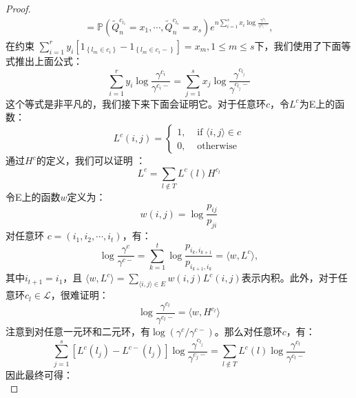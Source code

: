 \begin{proof}
\begin{equation*}
\begin{array}{l}
    =\mathbb{P}\left(\tilde{Q}_{n}^{c_{l_{1}}}=x_{1}, \cdots, \tilde{Q}_{n}^{c_{l_{s}}}=x_{s}\right) e^{n \sum_{i=1}^{s} x_{i} \log \frac{\gamma^{c_{l_i}}}{\gamma^{c_{l_i}-}}},
\end{array}
\end{equation*}
在约束 $\sum_{i=1}^{r} y_{i}\left[1_{\left\{l_{m} \in c_{i}\right\}}-1_{\left\{l_{m} \in c_{i}-\right\}}\right]=x_{m}, 1 \leq m \leq s$下，我们使用了下面等式推出上面公式：
\begin{equation} \label{constraint}
    \sum_{i=1}^{r} y_{i} \log \frac{\gamma^{c_{i}}}{\gamma^{c_{i}-}}=\sum_{j=1}^{s} x_{j} \log \frac{\gamma^{c_{l_{j}}}}{\gamma^{c_{l_{j}}-}}
\end{equation}
这个等式是非平凡的，我们接下来下面会证明它。对于任意环$c$，令$L^c$为E上的函数：
\begin{equation*}
    L^{c}(i, j)= \begin{cases}1, & \text { if }\langle i, j\rangle \in c \\ 0, & \text { otherwise }\end{cases}
\end{equation*}
通过$H^c$的定义，我们可以证明 \cite{kalpazidou2007cycle}：
\begin{equation*}
    L^c = \sum_{l \notin T} L^c(l) H^{c_l}
\end{equation*}
令E上的函数$w$定义为：
\begin{equation*}
    w(i, j) = \log \frac{p_{ij}}{p_{ji}}
\end{equation*}
对任意环 $c=(i_1, i_2, \cdots, i_t)$，有：
\begin{equation*}
    \log \frac{\gamma^{c}}{\gamma^{c-}} = \sum^t_{k=1} \log \frac{p_{i_k, i_{k+1}}}{p_{i_{k+1}, i_k}} = \langle w, L^c \rangle,
\end{equation*}
其中$i_{t+1} = i_1$，且 $\langle w, L^c \rangle = \sum_{\langle i, j \rangle \in E} w(i,j) L^c(i,j)$表示内积。此外，对于任意环$c_l \in \mathcal{L}$，很难证明：
\begin{equation*}
    \log \frac{\gamma^{c_l}}{\gamma^{c_l -}} = \langle w, H^{c_l} \rangle
\end{equation*}
注意到对任意一元环和二元环，有$\log (\gamma^c / \gamma^{c-})$。那么对任意环$c$，有：
\begin{equation*}
    \sum_{j=1}^{s}\left[L^{c}\left(l_{j}\right)-L^{c-}\left(l_{j}\right)\right] \log \frac{\gamma^{c_{l_{j}}}}{\gamma^{c_{j}-}}=\sum_{l \notin T} L^{c}(l) \log \frac{\gamma^{c_{l}}}{\gamma^{c_{l}-}}
\end{equation*}
因此最终可得：
\begin{equation*}

\end{equation*}
\end{proof}
